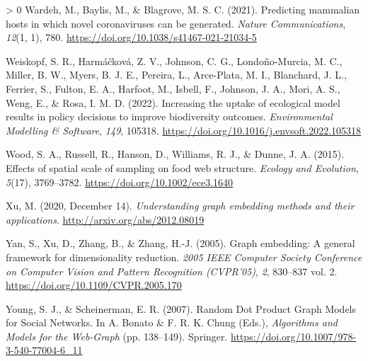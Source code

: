 \documentclass[11pt]{article}
\newlength{\cslhangindent}
\newenvironment{CSLReferences}[3] %
 {%
  \setlength{\parindent}{0pt}
  \ifodd #1 \everypar{\setlength{\hangindent}{\cslhangindent}}\ignorespaces\fi
  \ifnum #2 > 0
  \setlength{\parskip}{#2\baselineskip}
  \fi
 }%
 {}
\begin{document}
\begin{CSLReferences}{1}{0}
\leavevmode\hypertarget{ref-Wardeh2021PreMam}{}%
Wardeh, M., Baylis, M., \& Blagrove, M. S. C. (2021). Predicting
mammalian hosts in which novel coronaviruses can be generated.
\emph{Nature Communications}, \emph{12}(1, 1), 780.
\url{https://doi.org/10.1038/s41467-021-21034-5}

\leavevmode\hypertarget{ref-Weiskopf2022IncUpt}{}%
Weiskopf, S. R., Harmáčková, Z. V., Johnson, C. G., Londoño-Murcia, M.
C., Miller, B. W., Myers, B. J. E., Pereira, L., Arce-Plata, M. I.,
Blanchard, J. L., Ferrier, S., Fulton, E. A., Harfoot, M., Isbell, F.,
Johnson, J. A., Mori, A. S., Weng, E., \& Rosa, I. M. D. (2022).
Increasing the uptake of ecological model results in policy decisions to
improve biodiversity outcomes. \emph{Environmental Modelling \&
Software}, \emph{149}, 105318.
\url{https://doi.org/10.1016/j.envsoft.2022.105318}

\leavevmode\hypertarget{ref-Wood2015EffSpa}{}%
Wood, S. A., Russell, R., Hanson, D., Williams, R. J., \& Dunne, J. A.
(2015). Effects of spatial scale of sampling on food web structure.
\emph{Ecology and Evolution}, \emph{5}(17), 3769--3782.
\url{https://doi.org/10.1002/ece3.1640}

\leavevmode\hypertarget{ref-Xu2020UndGra}{}%
Xu, M. (2020, December 14). \emph{Understanding graph embedding methods
and their applications}. \url{http://arxiv.org/abs/2012.08019}

\leavevmode\hypertarget{ref-Yan2005GraEmb}{}%
Yan, S., Xu, D., Zhang, B., \& Zhang, H.-J. (2005). Graph embedding: A
general framework for dimensionality reduction. \emph{2005 IEEE Computer
Society Conference on Computer Vision and Pattern Recognition
(CVPR'05)}, \emph{2}, 830--837 vol. 2.
\url{https://doi.org/10.1109/CVPR.2005.170}

\leavevmode\hypertarget{ref-Young2007RanDot}{}%
Young, S. J., \& Scheinerman, E. R. (2007). Random Dot Product Graph
Models for Social Networks. In A. Bonato \& F. R. K. Chung (Eds.),
\emph{Algorithms and Models for the Web-Graph} (pp. 138--149). Springer.
\url{https://doi.org/10.1007/978-3-540-77004-6_11}

\end{CSLReferences}
\end{document}
